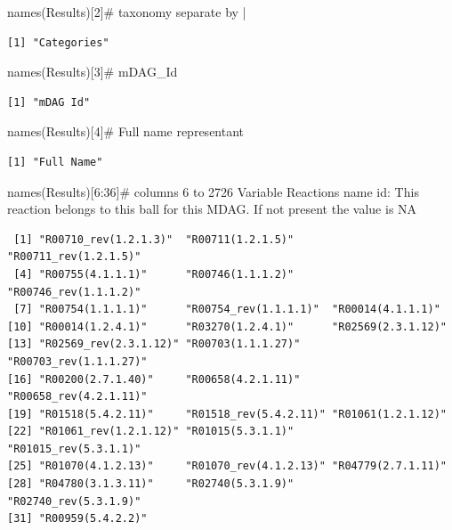 \documentclass[
  letterpaper,
  DIV=11,
  numbers=noendperiod]{scrreprt}
\newenvironment{Shaded}{\begin{snugshade}}{\end{snugshade}}
\newcommand{\CommentTok}[1]{\textcolor[rgb]{0.37,0.37,0.37}{#1}}
\newcommand{\DecValTok}[1]{\textcolor[rgb]{0.68,0.00,0.00}{#1}}
\newcommand{\FunctionTok}[1]{\textcolor[rgb]{0.28,0.35,0.67}{#1}}
\newcommand{\NormalTok}[1]{\textcolor[rgb]{0.00,0.23,0.31}{#1}}
\newcommand{\SpecialCharTok}[1]{\textcolor[rgb]{0.37,0.37,0.37}{#1}}
\begin{document}
\begin{Shaded}
\begin{Highlighting}[]
\FunctionTok{names}\NormalTok{(Results)[}\DecValTok{2}\NormalTok{]}\CommentTok{\# taxonomy separate by |}
\end{Highlighting}
\end{Shaded}

\begin{verbatim}
[1] "Categories"
\end{verbatim}

\begin{Shaded}
\begin{Highlighting}[]
\FunctionTok{names}\NormalTok{(Results)[}\DecValTok{3}\NormalTok{]}\CommentTok{\# mDAG\_Id }
\end{Highlighting}
\end{Shaded}

\begin{verbatim}
[1] "mDAG Id"
\end{verbatim}

\begin{Shaded}
\begin{Highlighting}[]
\FunctionTok{names}\NormalTok{(Results)[}\DecValTok{4}\NormalTok{]}\CommentTok{\# Full name representant}
\end{Highlighting}
\end{Shaded}

\begin{verbatim}
[1] "Full Name"
\end{verbatim}

\begin{Shaded}
\begin{Highlighting}[]
\FunctionTok{names}\NormalTok{(Results)[}\DecValTok{6}\SpecialCharTok{:}\DecValTok{36}\NormalTok{]}\CommentTok{\# columns 6 to 2726  Variable Reactions name id: This reaction belongs to this ball for this MDAG. If not present the value is NA}
\end{Highlighting}
\end{Shaded}

\begin{verbatim}
 [1] "R00710_rev(1.2.1.3)"  "R00711(1.2.1.5)"      "R00711_rev(1.2.1.5)" 
 [4] "R00755(4.1.1.1)"      "R00746(1.1.1.2)"      "R00746_rev(1.1.1.2)" 
 [7] "R00754(1.1.1.1)"      "R00754_rev(1.1.1.1)"  "R00014(4.1.1.1)"     
[10] "R00014(1.2.4.1)"      "R03270(1.2.4.1)"      "R02569(2.3.1.12)"    
[13] "R02569_rev(2.3.1.12)" "R00703(1.1.1.27)"     "R00703_rev(1.1.1.27)"
[16] "R00200(2.7.1.40)"     "R00658(4.2.1.11)"     "R00658_rev(4.2.1.11)"
[19] "R01518(5.4.2.11)"     "R01518_rev(5.4.2.11)" "R01061(1.2.1.12)"    
[22] "R01061_rev(1.2.1.12)" "R01015(5.3.1.1)"      "R01015_rev(5.3.1.1)" 
[25] "R01070(4.1.2.13)"     "R01070_rev(4.1.2.13)" "R04779(2.7.1.11)"    
[28] "R04780(3.1.3.11)"     "R02740(5.3.1.9)"      "R02740_rev(5.3.1.9)" 
[31] "R00959(5.4.2.2)"     
\end{verbatim}
\end{document}
